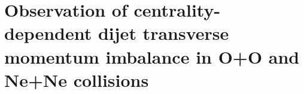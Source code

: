 \section{Observation of centrality-dependent dijet transverse momentum imbalance in O+O and Ne+Ne collisions}






